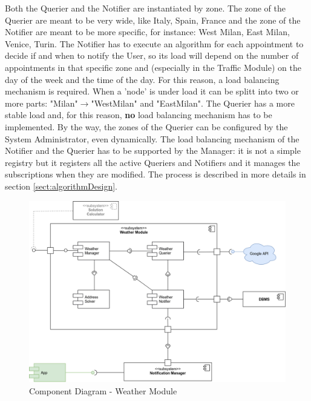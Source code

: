 		\medskip
		Both the Querier and the Notifier are instantiated by zone. The zone of the Querier are meant to be very wide, like Italy, Spain, France and the zone of the Notifier are meant to be more specific, for instance: West Milan, East Milan, Venice, Turin.\newline
		The Notifier has to execute an algorithm for each appointment to decide if and when to notify the User, so its load will depend on the number of appointments in that specific zone and (especially in the Traffic Module) on the day of the week and the time of the day. For this reason, a load balancing mechanism is required. When a 'node' is under load it can be splitt into two or more parts: "Milan"$\rightarrow$"WestMilan" and "EastMilan".\newline
		The Querier has a more stable load and, for this reason, \textbf{no} load balancing mechanism has to be implemented. By the way, the zones of the Querier can be configured by the System Administrator, even dynamically.\newline
		The load balancing mechanism of the Notifier and the  Querier has to be supported by the Manager: it is not a simple registry but it registers all the active Queriers and Notifiers and it manages the subscriptions when they are modified.\newline
		The process is described in more details in section \ref{sect:algorithmDesign}.

		\begin{figure}[H]
			\centerline{\includegraphics[width=0.9\paperwidth]{Images/CD_WeatherModule}}
			\caption{Component Diagram - Weather Module}
		\end{figure}

